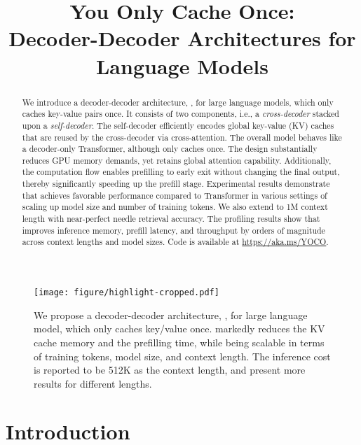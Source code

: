 \title{You Only Cache Once:\\Decoder-Decoder Architectures for Language Models}



\maketitle

\begin{abstract}
We introduce a decoder-decoder architecture, \our{}, for large language models, which only caches key-value pairs once. It consists of two components, i.e., a \textit{cross-decoder} stacked upon a \textit{self-decoder}. The self-decoder efficiently encodes global key-value (KV) caches that are reused by the cross-decoder via cross-attention. The overall model behaves like a decoder-only Transformer, although \our{} only caches once. The design substantially reduces GPU memory demands, yet retains global attention capability. Additionally, the computation flow enables prefilling to early exit without changing the final output, thereby significantly speeding up the prefill stage. Experimental results demonstrate that \our{} achieves favorable performance compared to Transformer in various settings of scaling up model size and number of training tokens. We also extend \our{} to 1M context length with near-perfect needle retrieval accuracy. The profiling results show that \our{} improves inference memory, prefill latency, and throughput by orders of magnitude across context lengths and model sizes. Code is available at \url{https://aka.ms/YOCO}.
\end{abstract}

\vfill{}

\begin{figure*}[ht]
\centering
\captionsetup{type=figure}
\texttt{[image: figure/highlight-cropped.pdf]}
\caption{We propose a decoder-decoder architecture, \our{}, for large language model, which only caches key/value once.
\our{} markedly reduces the KV cache memory and the prefilling time, while being scalable in terms of training tokens, model size, and context length.
The inference cost is reported to be 512K as the context length, and  present more results for different lengths.
}
\label{fig:highlight}
\end{figure*}

\vfill{}

\newpage
\section{Introduction}
\label{sec:intro}

